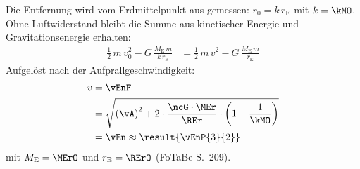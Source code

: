 \begin{center}
\end{center}

Die Entfernung wird vom Erdmittelpunkt aus gemessen: $r_0 = k\,r_\mathrm{E}$ mit $k = \kMO$. Ohne Luftwiderstand bleibt die Summe aus kinetischer Energie und Gravitationsenergie erhalten:
\begin{align}
 \frac{1}{2}\,m\,v_0^2-G\,\frac{M_\mathrm{E}\,m}{k\,r_\mathrm{E}} &= \frac{1}{2}\,m\,v^2-G\,\frac{M_\mathrm{E}\,m}{r_\mathrm{E}}
\end{align}
Aufgelöst nach der Aufprallgeschwindigkeit:
\begin{align}
 v &= \vEnF \\
   &= \sqrt{\left(\vA\right)^2+2\cdot\frac{\ncG\cdot\MEr}{\REr}\cdot\left(1-\frac{1}{\kMO}\right)} \\
   &= \vEn \approx \result{\vEnP{3}{2}}
\end{align}
mit $M_\mathrm{E} = \MErO$ und $r_\mathrm{E} = \RErO$ (FoTaBe S.~209).
